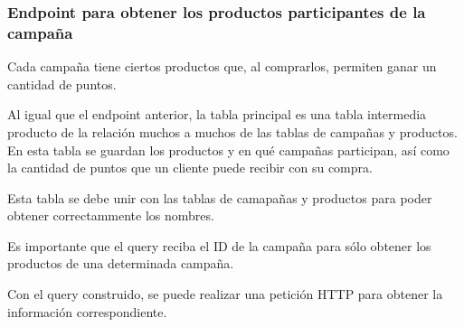 \subsubsection{Endpoint para obtener los productos participantes de la campaña}
Cada campaña tiene ciertos productos que, al comprarlos, permiten ganar un cantidad de puntos.

Al igual que el endpoint anterior, la tabla principal es una tabla intermedia producto de la relación muchos a muchos de las tablas de campañas y productos. En esta tabla se guardan los productos y en qué campañas participan, así como la cantidad de puntos que un cliente puede recibir con su compra.

Esta tabla se debe unir con las tablas de camapañas y productos para poder obtener correctammente los nombres.

Es importante que el query reciba el ID de la campaña para sólo obtener los productos de una determinada campaña.

Con el query construido, se puede realizar una petición HTTP para obtener la información correspondiente.